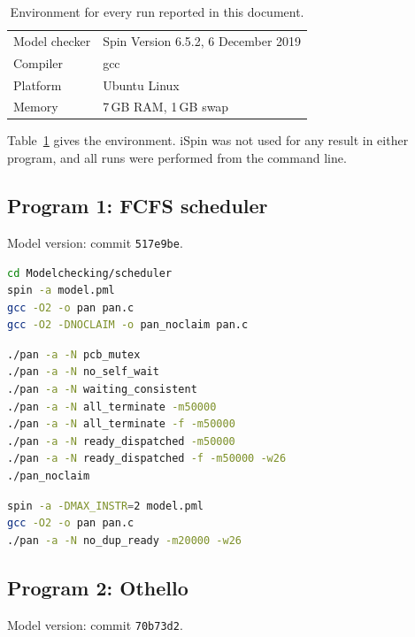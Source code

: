 \documentclass[10pt,a4paper]{article}
\newcommand{\code}[1]{\texttt{#1}}
\begin{document}
\begin{table}[htbp]
\centering
\caption{Environment for every run reported in this document.}
\label{tab:env}
\begin{tabular}{l l}
\toprule
Model checker & Spin Version 6.5.2, 6 December 2019 \\
Compiler & gcc \\
Platform & Ubuntu Linux \\
Memory & 7\,GB RAM, 1\,GB swap \\
\bottomrule
\end{tabular}
\end{table}

Table~\ref{tab:env} gives the environment. iSpin was not used for any result
in either program, and all runs were performed from the command line.

\subsection*{Program 1: FCFS scheduler}

Model version: commit \code{517e9be}.

\begin{lstlisting}[language=bash,caption={Build}]
cd Modelchecking/scheduler
spin -a model.pml
gcc -O2 -o pan pan.c
gcc -O2 -DNOCLAIM -o pan_noclaim pan.c
\end{lstlisting}

\begin{lstlisting}[language=bash,caption={Verification runs, default configuration (MAX\_INSTR 3)}]
./pan -a -N pcb_mutex
./pan -a -N no_self_wait
./pan -a -N waiting_consistent
./pan -a -N all_terminate -m50000
./pan -a -N all_terminate -f -m50000
./pan -a -N ready_dispatched -m50000
./pan -a -N ready_dispatched -f -m50000 -w26
./pan_noclaim
\end{lstlisting}

\begin{lstlisting}[language=bash,caption={Reduced configuration (MAX\_INSTR 2), for the property that holds}]
spin -a -DMAX_INSTR=2 model.pml
gcc -O2 -o pan pan.c
./pan -a -N no_dup_ready -m20000 -w26
\end{lstlisting}

\subsection*{Program 2: Othello}

Model version: commit \code{70b73d2}.
\end{document}
